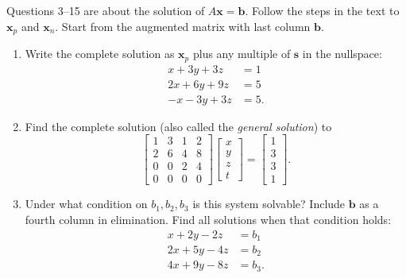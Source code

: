 \documentclass[14pt, a4paper]{article}
\begin{document}
\noindent Questions 3--15 are about the solution of $A\mathbf{x} = \mathbf{b}$. Follow the steps in the text to $\mathbf{x}_p$ and $\mathbf{x}_n$. Start from the augmented matrix with last column $\mathbf{b}$.

\begin{enumerate}[resume]
    \item Write the complete solution as $\mathbf{x}_p$ plus any multiple of $\mathbf{s}$ in the nullspace:
          \begin{align*}
              x + 3y + 3z  & = 1  \\
              2x + 6y + 9z & = 5  \\
              -x - 3y + 3z & = 5.
          \end{align*}

    \item Find the complete solution (also called the \emph{general solution}) to
          \[
              \begin{bmatrix}
                  1 & 3 & 1 & 2 \\
                  2 & 6 & 4 & 8 \\
                  0 & 0 & 2 & 4 \\
                  0 & 0 & 0 & 0
              \end{bmatrix}
              \begin{bmatrix} x \\ y \\ z \\ t \end{bmatrix}
              =
              \begin{bmatrix} 1 \\ 3 \\ 3 \\ 1 \end{bmatrix}.
          \]

    \item Under what condition on $b_1, b_2, b_3$ is this system solvable? Include $\mathbf{b}$ as a fourth column in elimination. Find all solutions when that condition holds:
          \begin{align*}
              x + 2y - 2z  & = b_1  \\
              2x + 5y - 4z & = b_2  \\
              4x + 9y - 8z & = b_3.
          \end{align*}


\end{enumerate}
\end{document}
